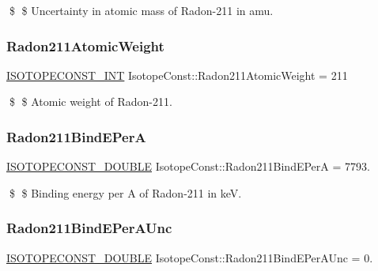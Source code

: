 \$ \$ Uncertainty in atomic mass of Radon-\/211 in amu. \mbox{\label{group___isotope_const-_radon-_rn211_ga3cbca6bce298e851294621858901f86e}} 
\subsubsection{\texorpdfstring{Radon211\+Atomic\+Weight}{Radon211AtomicWeight}}
{\footnotesize\ttfamily \mbox{\hyperlink{group___isotope_const-_macros_ga5f18360b3e99483a35c32d789e62621c}{I\+S\+O\+T\+O\+P\+E\+C\+O\+N\+S\+T\+\_\+\+I\+NT}} Isotope\+Const\+::\+Radon211\+Atomic\+Weight = 211}

\$ \$ Atomic weight of Radon-\/211. \mbox{\label{group___isotope_const-_radon-_rn211_ga82ca7bb2e4a131a7fa32de83bbd7f8c0}} 
\subsubsection{\texorpdfstring{Radon211\+Bind\+E\+PerA}{Radon211BindEPerA}}
{\footnotesize\ttfamily \mbox{\hyperlink{group___isotope_const-_macros_ga8f45a7272ce02c0b4c65c44636ed719a}{I\+S\+O\+T\+O\+P\+E\+C\+O\+N\+S\+T\+\_\+\+D\+O\+U\+B\+LE}} Isotope\+Const\+::\+Radon211\+Bind\+E\+PerA = 7793.}

\$ \$ Binding energy per A of Radon-\/211 in keV. \mbox{\label{group___isotope_const-_radon-_rn211_ga59712bceb93728e662c83def44dcb9b7}} 
\subsubsection{\texorpdfstring{Radon211\+Bind\+E\+Per\+A\+Unc}{Radon211BindEPerAUnc}}
{\footnotesize\ttfamily \mbox{\hyperlink{group___isotope_const-_macros_ga8f45a7272ce02c0b4c65c44636ed719a}{I\+S\+O\+T\+O\+P\+E\+C\+O\+N\+S\+T\+\_\+\+D\+O\+U\+B\+LE}} Isotope\+Const\+::\+Radon211\+Bind\+E\+Per\+A\+Unc = 0.}

